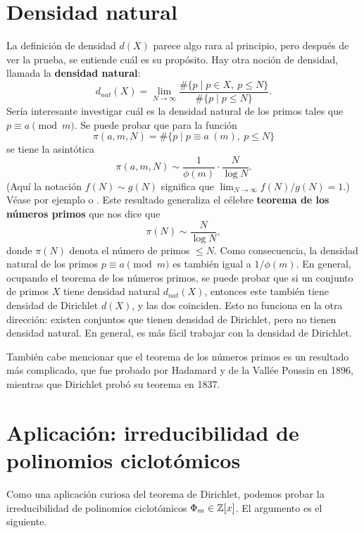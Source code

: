 
\section{Densidad natural}

La definición de densidad $d (X)$ parece algo rara al principio, pero después
de ver la prueba, se entiende cuál es su propósito. Hay otra noción de densidad,
llamada la \textbf{densidad natural}:
$$d_{nat} (X) = \lim_{N\to\infty} \frac{\# \{ p \mid p\in X, ~ p \le N \}}{\# \{ p \mid p \le N \}}.$$
Sería interesante investigar cuál es la densidad natural de los primos tales que
$p \equiv a \pmod{m}$. Se puede probar que para la función
$$\pi (a,m,N) = \# \{ p \mid p \equiv a ~ (m), ~ p \le N \}$$
se tiene la asintótica
$$\pi (a,m,N) \sim \frac{1}{\phi (m)}\cdot \frac{N}{\log N}.$$
(Aquí la notación $f (N) \sim g (N)$ significa que
$\lim_{N\to\infty} f(N)/g(N) = 1$.) Véase por ejemplo
\cite[Chapter~7]{Everiste-ANT} o
\cite[Chapter~6]{Hlawka-Taschner-Schoissengeier}.
Este resultado generaliza el célebre \textbf{teorema de los números primos}
que nos dice que
$$\pi (N) \sim \frac{N}{\log N},$$
donde $\pi (N)$ denota el número de primos $\le N$. Como consecuencia,
la densidad natural de los primos $p \equiv a \pmod{m}$ es también igual a
$1/\phi(m)$. En general, ocupando el teorema de los números primos, se puede
probar que si un conjunto de primos $X$ tiene densidad natural $d_{nat} (X)$,
entonces este también tiene densidad de Dirichlet $d (X)$, y las dos coinciden.
Esto no funciona en la otra dirección: existen conjuntos que tienen densidad
de Dirichlet, pero no tienen densidad natural. En general, es más fácil trabajar
con la densidad de Dirichlet.

También cabe mencionar que el teorema de los números primos es un resultado más
complicado, que fue probado por Hadamard y de la Vallée Poussin en 1896,
mientras que Dirichlet probó su teorema en 1837.


\section{Aplicación: irreducibilidad de polinomios ciclotómicos}
\label{sec:irreducibilidad-de-Phi-Dirichlet}

Como una aplicación curiosa del teorema de Dirichlet, podemos probar
la irreducibilidad de polinomios ciclotómicos $\Phi_m \in \mathbb{Z} [x]$. El argumento
es el siguiente.

